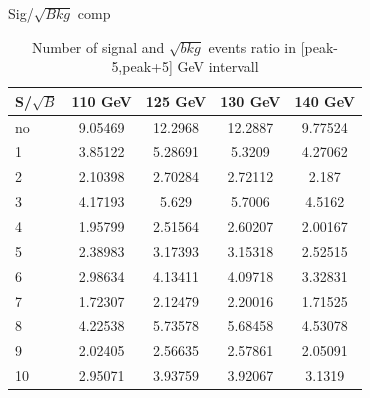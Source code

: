 \documentclass[10pt,UKenglish, leqno, xcolor = dvipsnames]{beamer}
\begin{document}
		\begin{frame}{Sig/$\sqrt{Bkg}$ comp}
			\vfill
			\begin{table}[tbp]
				\centering
				\begin{tabular}{lcccc}
					\toprule[1.5pt]
					S/$\sqrt{B}$& 110 GeV	& 125 GeV	& 130 GeV	& 140 GeV	\\
					\midrule
					no	& 9.05469	& 12.2968	& 12.2887	& 9.77524	\\
					1	& 3.85122	& 5.28691	& 5.3209	& 4.27062 	\\
					2	& 2.10398	& 2.70284	& 2.72112	& 2.187 	\\
					3	& 4.17193	& 5.629		& 5.7006	& 4.5162 	\\
					4	& 1.95799	& 2.51564	& 2.60207	& 2.00167 	\\
					5	& 2.38983	& 3.17393	& 3.15318	& 2.52515 	\\
					6	& 2.98634	& 4.13411	& 4.09718	& 3.32831 	\\
					7	& 1.72307	& 2.12479	& 2.20016	& 1.71525 	\\
					8	& 4.22538	& 5.73578	& 5.68458	& 4.53078 	\\
					9	& 2.02405	& 2.56635	& 2.57861	& 2.05091 	\\
					10	& 2.95071	& 3.93759	& 3.92067	& 3.1319 	\\
					
					\bottomrule[1.5pt]
				\end{tabular}
				\caption{Number of signal and $\sqrt{bkg}$ events ratio in [peak-5,peak+5] GeV intervall}
			\end{table}
			\vfill
		\end{frame}
		
\end{document}
